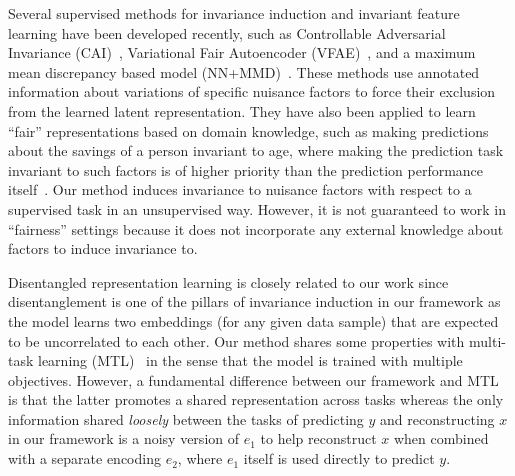 Several supervised methods for invariance induction and invariant feature learning have been developed recently, such as Controllable Adversarial Invariance (CAI)~\cite{bib:sai}, Variational Fair Autoencoder (VFAE)~\cite{bib:vfae}, and a maximum mean discrepancy based model (NN+MMD)~\cite{bib:nnmmd}. These methods use annotated information about variations of specific nuisance factors to force their exclusion from the learned latent representation. They have also been applied to learn ``fair'' representations based on domain knowledge, such as making predictions about the savings of a person invariant to age, where making the prediction task invariant to such factors is of higher priority than the prediction performance itself~\cite{bib:sai}. Our method induces invariance to nuisance factors with respect to a supervised task in an unsupervised way. However, it is not guaranteed to work in ``fairness'' settings because it does not incorporate any external knowledge about factors to induce invariance to.

Disentangled representation learning is closely related to our work since disentanglement is one of the pillars of invariance induction in our framework as the model learns two embeddings (for any given data sample) that are expected to be uncorrelated to each other. Our method shares some properties with multi-task learning (MTL)~\cite{bib:mtl} in the sense that the model is trained with multiple objectives. However, a fundamental difference between our framework and MTL is that the latter promotes a shared representation across tasks whereas the only information shared \emph{loosely} between the tasks of predicting $y$ and reconstructing $x$ in our framework is a noisy version of $e_1$ to help reconstruct $x$ when combined with a separate encoding $e_2$, where $e_1$ itself is used directly to predict $y$.